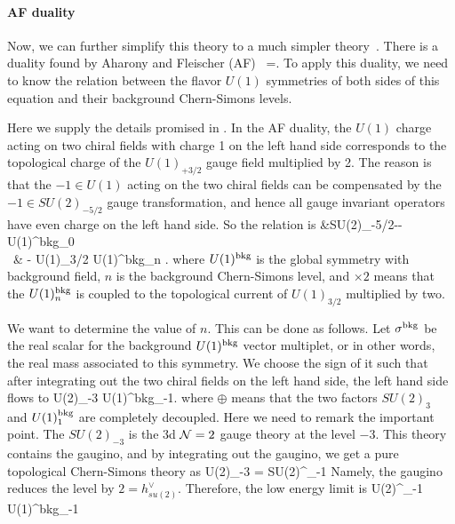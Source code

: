 \documentclass[a4paper,11pt]{article}
\def\CN{{\cal N}}
\def\beq#1\eeq{\begin{align}#1\end{align}}
\begin{document}
\paragraph{AF duality}
Now, we can further simplify this theory to a much simpler theory~\cite{Gang:2017lsr}.
There is a duality found by Aharony and Fleischer (AF)~\cite{Aharony:2014uya}
\beq
\text{(Two chiral fields coupled to $ SU(2)_{-5/2}$)}=.
\eeq
To apply this duality, we need to know the relation between the flavor $U(1)$ symmetries of both sides of this equation and their background Chern-Simons levels.


Here we supply the details promised in \cite{Gang:2017lsr}.
In the AF duality, the $U(1)$ charge acting on two chiral fields with charge 1 on the left hand side corresponds to the 
topological charge of the $U(1)_{+3/2}$ gauge field multiplied by 2. The reason is that the $-1 \in U(1)$ acting on the two chiral fields
can be compensated by the $-1 \in SU(2)_{-5/2}$ gauge transformation, and hence all gauge invariant operators have even charge on the left hand side.
So the relation is
\beq
&SU(2)_{-5/2}--U(1)^{\rm bkg}_0  \nonumber \\
\Longleftrightarrow~&  -  U(1)_{3/2}     U(1)^{\rm bkg}_n . 
\label{eq:AF}
\eeq
where $U(1)^{\rm bkg}$ is the global symmetry with background field, $n$ is the background Chern-Simons level,
and $ \times 2 $ means that the $U(1)^{\rm bkg}_n$ is coupled to the topological current of $U(1)_{3/2}$ multiplied by two.

We want to determine the value of $n$.
This can be done as follows. Let $\sigma^{\rm bkg}$ be the real scalar for the background $U(1)^{\rm bkg}$ vector multiplet, or 
in other words, the real mass associated to this symmetry. 
We choose the sign of it such that after integrating out the two chiral fields on the left hand side, the left hand side flows to
\beq
SU(2)_{-3} \oplus U(1)^{\rm bkg}_{-1}.
\eeq
where $\oplus$ means that the two factors $SU(2)_3$ and $U(1)^{\rm bkg}_1$ are completely decoupled.
Here we need to remark the important point. The $SU(2)_{-3}$ is the 3d $\CN=2$ gauge theory at the level $-3$. This theory contains the gaugino,
and by integrating out the gaugino, we get a pure topological Chern-Simons theory as
\beq
SU(2)_{-3} = SU(2)^_{-1}
\eeq
Namely, the gaugino reduces the level by $2 = h^\vee _{su(2)}$.
Therefore, the low energy limit is
\beq
SU(2)^_{-1} \oplus U(1)^{\rm bkg}_{-1}
\eeq
\end{document}
